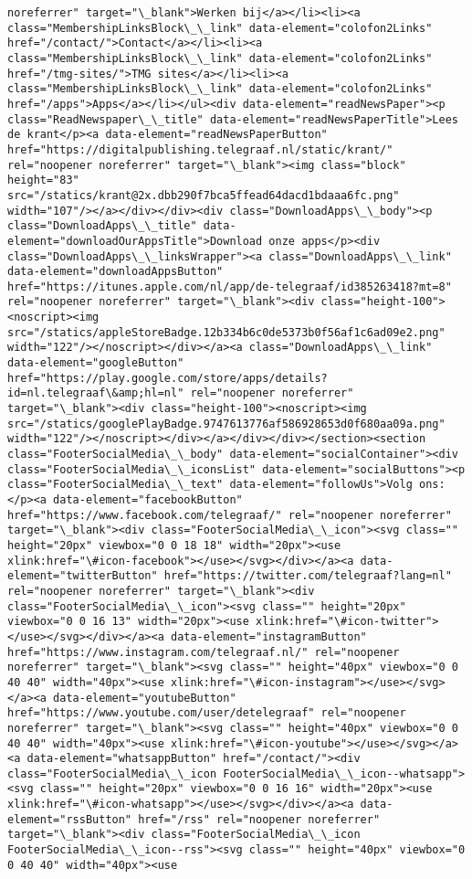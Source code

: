 \documentclass[11pt]{article}
\begin{document}
\begin{Verbatim}[commandchars=\\\{\}]
noreferrer" target="\_blank">Werken bij</a></li><li><a class="MembershipLinksBlock\_\_link" data-element="colofon2Links" href="/contact/">Contact</a></li><li><a class="MembershipLinksBlock\_\_link" data-element="colofon2Links" href="/tmg-sites/">TMG sites</a></li><li><a class="MembershipLinksBlock\_\_link" data-element="colofon2Links" href="/apps">Apps</a></li></ul><div data-element="readNewsPaper"><p class="ReadNewspaper\_\_title" data-element="readNewsPaperTitle">Lees de krant</p><a data-element="readNewsPaperButton" href="https://digitalpublishing.telegraaf.nl/static/krant/" rel="noopener noreferrer" target="\_blank"><img class="block" height="83" src="/statics/krant@2x.dbb290f7bca5ffead64dacd1bdaaa6fc.png" width="107"/></a></div></div><div class="DownloadApps\_\_body"><p class="DownloadApps\_\_title" data-element="downloadOurAppsTitle">Download onze apps</p><div class="DownloadApps\_\_linksWrapper"><a class="DownloadApps\_\_link" data-element="downloadAppsButton" href="https://itunes.apple.com/nl/app/de-telegraaf/id385263418?mt=8" rel="noopener noreferrer" target="\_blank"><div class="height-100"><noscript><img src="/statics/appleStoreBadge.12b334b6c0de5373b0f56af1c6ad09e2.png" width="122"/></noscript></div></a><a class="DownloadApps\_\_link" data-element="googleButton" href="https://play.google.com/store/apps/details?id=nl.telegraaf\&amp;hl=nl" rel="noopener noreferrer" target="\_blank"><div class="height-100"><noscript><img src="/statics/googlePlayBadge.9747613776af586928653d0f680aa09a.png" width="122"/></noscript></div></a></div></div></section><section class="FooterSocialMedia\_\_body" data-element="socialContainer"><div class="FooterSocialMedia\_\_iconsList" data-element="socialButtons"><p class="FooterSocialMedia\_\_text" data-element="followUs">Volg ons:</p><a data-element="facebookButton" href="https://www.facebook.com/telegraaf/" rel="noopener noreferrer" target="\_blank"><div class="FooterSocialMedia\_\_icon"><svg class="" height="20px" viewbox="0 0 18 18" width="20px"><use xlink:href="\#icon-facebook"></use></svg></div></a><a data-element="twitterButton" href="https://twitter.com/telegraaf?lang=nl" rel="noopener noreferrer" target="\_blank"><div class="FooterSocialMedia\_\_icon"><svg class="" height="20px" viewbox="0 0 16 13" width="20px"><use xlink:href="\#icon-twitter"></use></svg></div></a><a data-element="instagramButton" href="https://www.instagram.com/telegraaf.nl/" rel="noopener noreferrer" target="\_blank"><svg class="" height="40px" viewbox="0 0 40 40" width="40px"><use xlink:href="\#icon-instagram"></use></svg></a><a data-element="youtubeButton" href="https://www.youtube.com/user/detelegraaf" rel="noopener noreferrer" target="\_blank"><svg class="" height="40px" viewbox="0 0 40 40" width="40px"><use xlink:href="\#icon-youtube"></use></svg></a><a data-element="whatsappButton" href="/contact/"><div class="FooterSocialMedia\_\_icon FooterSocialMedia\_\_icon--whatsapp"><svg class="" height="20px" viewbox="0 0 16 16" width="20px"><use xlink:href="\#icon-whatsapp"></use></svg></div></a><a data-element="rssButton" href="/rss" rel="noopener noreferrer" target="\_blank"><div class="FooterSocialMedia\_\_icon FooterSocialMedia\_\_icon--rss"><svg class="" height="40px" viewbox="0 0 40 40" width="40px"><use 
\end{Verbatim}
\end{document}
